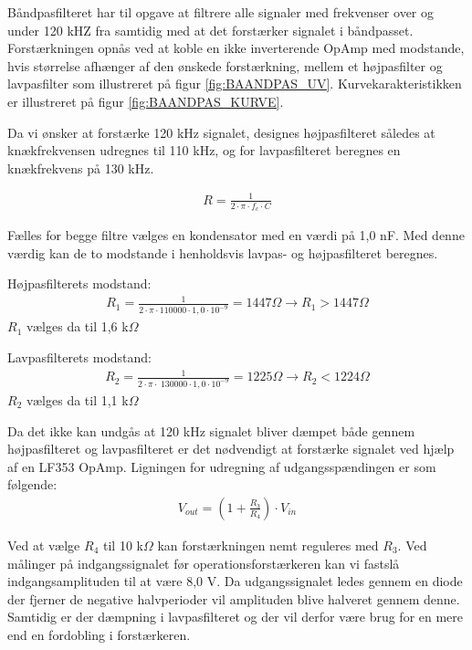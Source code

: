 Båndpasfilteret har til opgave at filtrere alle signaler med frekvenser over og under 120 kHZ fra samtidig med at det forstærker signalet i båndpasset. Forstærkningen opnås ved at koble en ikke inverterende OpAmp med modstande, hvis størrelse afhænger af den ønskede forstærkning, mellem et højpasfilter og lavpasfilter som illustreret på figur \ref{fig:BAANDPAS_UV}. Kurvekarakteristikken er illustreret på figur \ref{fig:BAANDPAS_KURVE}.

Da vi ønsker at forstærke 120 kHz signalet, designes højpasfilteret således at knækfrekvensen udregnes til 110 kHz, og for lavpasfilteret beregnes en knækfrekvens på 130 kHz. 

\begin{align}
R = \frac{1}{2 \cdot \pi \cdot f_c \cdot C } 
\end{align}

Fælles for begge filtre vælges en kondensator med en værdi på 1,0 nF. Med denne værdig kan de to modstande i henholdsvis lavpas- og højpasfilteret beregnes.

Højpasfilterets modstand:
\begin{align}
R_1 = \frac{1}{2 \cdot \pi \cdot 110000 \cdot 1,0 \cdot 10^{-9}} = 1447 \Omega
\rightarrow R_1 > 1447 \Omega
\end{align}
$R_1$ vælges da til 1,6 k$\Omega$


Lavpasfilterets modstand:
\begin{align}
R_2 = \frac{1}{2 \cdot \pi \cdot \ 130000 \cdot 1,0 \cdot 10^{-9}} = 1225 \Omega
\rightarrow R_2 < 1224 \Omega
\end{align}
$R_2$ vælges da til 1,1 k$\Omega$

Da det ikke kan undgås at 120 kHz signalet bliver dæmpet både gennem højpasfilteret og lavpasfilteret er det nødvendigt at forstærke signalet ved hjælp af en LF353 OpAmp.
Ligningen for udregning af udgangsspændingen er som følgende:
\begin{align}
V_{out} = (1 + \frac{R_3}{R_4}) \cdot V_{in}
\end{align} 

Ved at vælge $R_4$ til 10 k$\Omega$ kan forstærkningen nemt reguleres med $R_3$.
Ved målinger på indgangssignalet før operationsforstærkeren kan vi fastslå indgangsamplituden til at være 8,0 V. Da udgangssignalet ledes gennem en diode der fjerner de negative halvperioder vil amplituden blive halveret gennem denne. Samtidig er der dæmpning i lavpasfilteret og der vil derfor være brug for en mere end en fordobling i forstærkeren. 

